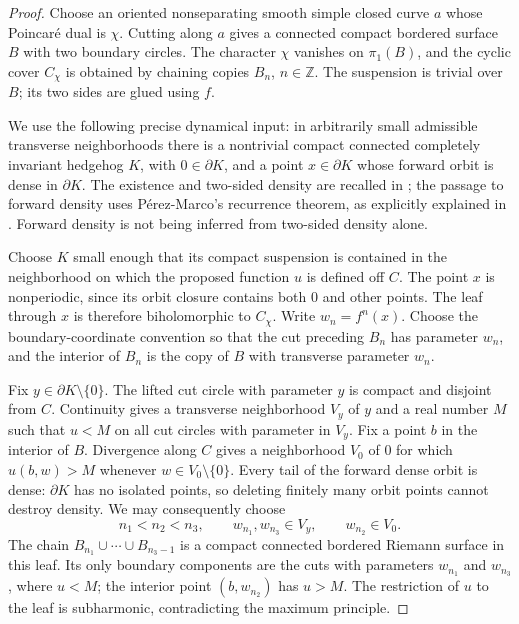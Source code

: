 \documentclass[11pt]{amsart}
\theoremstyle{definition}
\theoremstyle{remark}
\numberwithin{equation}{section}
\begin{document}
\begin{proof}
Choose an oriented nonseparating smooth simple closed curve $a$ whose
Poincar\'e dual is $\chi$. Cutting along $a$ gives a connected compact
bordered surface $B$ with two boundary circles. The character $\chi$ vanishes
on $\pi_1(B)$, and the cyclic cover $C_\chi$ is obtained by chaining copies
$B_n$, $n\in\mathbb Z$. The suspension is trivial over $B$; its two sides
are glued using $f$.

We use the following precise dynamical input: in arbitrarily small admissible
transverse neighborhoods there is a nontrivial compact connected completely
invariant hedgehog $K$, with $0\in\partial K$, and a point
$x\in\partial K$ whose forward orbit is dense in $\partial K$.
The existence and two-sided density are recalled in
\cite[Theorems~2.1 and~2.3]{KoikeOgawa};
the passage to forward density uses P\'erez-Marco's recurrence theorem,
as explicitly explained in \cite[Section~5]{KoikeOgawa}. Forward density is not being
inferred from two-sided density alone.

Choose $K$ small enough that its compact suspension is contained in the
neighborhood on which the proposed function $u$ is defined off $C$.
The point $x$ is nonperiodic, since its orbit closure contains both $0$ and
other points. The leaf through $x$ is therefore biholomorphic to $C_\chi$.
Write $w_n=f^n(x)$. Choose the boundary-coordinate convention so that the
cut preceding $B_n$ has parameter $w_n$, and the interior of $B_n$ is
the copy of $B$ with transverse parameter $w_n$.

Fix $y\in\partial K\setminus\{0\}$. The lifted cut circle with parameter
$y$ is compact and disjoint from $C$. Continuity gives a transverse
neighborhood $V_y$ of $y$ and a real number $M$ such that $u<M$ on all cut
circles with parameter in $V_y$. Fix a point $b$ in the interior of $B$.
Divergence along $C$ gives a neighborhood $V_0$ of $0$ for which
$u(b,w)>M$ whenever $w\in V_0\setminus\{0\}$.
Every tail of the forward dense orbit is dense: $\partial K$ has no isolated
points, so deleting finitely many orbit points cannot destroy density.
We may consequently choose
\[
 n_1<n_2<n_3,\qquad
 w_{n_1},w_{n_3}\in V_y,\qquad w_{n_2}\in V_0.
\]
The chain $B_{n_1}\cup\cdots\cup B_{n_3-1}$ is a compact connected
bordered Riemann surface in this leaf. Its only boundary components are the
cuts with parameters $w_{n_1}$ and $w_{n_3}$, where $u<M$; the interior
point $(b,w_{n_2})$ has $u>M$. The restriction of $u$ to the leaf is
subharmonic, contradicting the maximum principle.
\end{proof}
\end{document}
